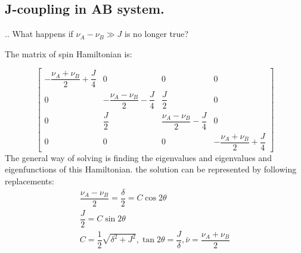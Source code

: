 \documentclass{beamer}
\begin{document}
\subsection{J-coupling in AB system.}
\begin{frame}{\thesection.\thesubsection. \insertsubsection}
	What happens if $\nu_A - \nu_B \gg J$ is no longer true?
	
		The matrix of spin Hamiltonian is:
		
			
			{\tiny
				\begin{equation}				
				\begin{bmatrix}
				-\dfrac{\nu_A+ \nu_{B}  }{2} + \dfrac{J}{4}   & 0 & 0 & 0 \\
				0 & -\dfrac{\nu_A-\nu_B}{2} - \dfrac{J}{4}  & \dfrac{J}{2} & 0 \\
				0 & \dfrac{J}{2} & \dfrac{\nu_A-\nu_B}{2} - \dfrac{J}{4}  & 0 \\
				0 & 0 & 0 & -\dfrac{\nu_A+\nu_B}{2} + \dfrac{J}{4}                  
				\end{bmatrix}
				\end{equation}
			}%
		\onslide<2-> The general way of solving is finding the eigenvalues and eigenvalues and eigenfunctions of this Hamiltonian.
		\onslide<3->
		the solution can be represented by following replacements:
		\begin{equation}
		\begin{array}{l}
		\dfrac{\nu_A - \nu_B}{2} = \dfrac{\delta}{2} = C \cos 2\theta \\
		\dfrac{J}{2} = C \sin 2\theta \\
		C = \dfrac{1}{2}\sqrt{\delta^2 + J^2}, \tan 2\theta = \dfrac{J}{\delta}, \bar{\nu} = \dfrac{\nu_A + \nu_B}{2}
		\end{array}
		\end{equation}
\end{frame}
\end{document}
